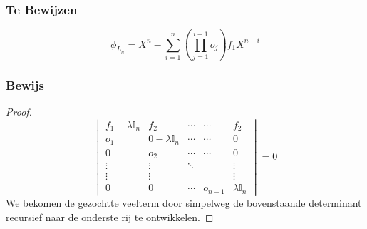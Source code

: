 \documentclass[lineaire_algebra_oplossingen.tex]{subfiles}
\begin{document}
\subsubsection*{Te Bewijzen}
\[
\phi_{L_{n}} =X^{n} -\sum_{i=1}^n \left(\prod_{j=1}^{i-1} o_{j} \right)f_1X^{n-i}
\]

\subsubsection*{Bewijs}
\begin{proof}
\[
\begin{vmatrix}
f_1-\lambda\mathbb{I}_n & f_2 & \cdots & \cdots & f_2\\
o_1 & 0-\lambda\mathbb{I}_n & \cdots & \cdots & 0\\
0 & o_2 & \cdots & \cdots & 0\\
\vdots & \vdots & \ddots & & \vdots\\
\vdots & \vdots & & & \vdots\\
0 & 0 & \cdots & o_{n-1} & \lambda\mathbb{I}_n
\end{vmatrix}
= 0
\]
We bekomen de gezochtte veelterm door simpelweg de bovenstaande determinant recursief naar de onderste rij te ontwikkelen.
\end{proof}
\end{document}
